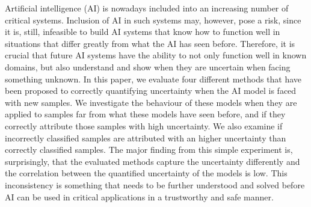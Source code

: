 
  Artificial intelligence (AI) is nowadays included into an increasing number of critical systems.
  Inclusion of AI in such systems may, however, pose a risk, since it is, still, infeasible to build AI systems that know how to function well in situations that differ greatly from what the AI has seen before.
  Therefore, it is crucial that future AI systems have the ability to not only function well in known domains, but also understand and show when they are uncertain when facing something unknown.
  In this paper, we evaluate four different methods that have been proposed to correctly quantifying uncertainty when the AI model is faced with new samples.
  We investigate the behaviour of these models when they are applied to samples far from what these models have seen before, and if they correctly attribute those samples with high uncertainty.
  We also examine if incorrectly classified samples are attributed with an higher uncertainty than correctly classified samples.
  The major finding from this simple experiment is, surprisingly, that the evaluated methods capture the uncertainty differently and the correlation between the quantified uncertainty of the models is low.
  This inconsistency is something that needs to be further understood and solved before AI can be used in critical applications in a trustworthy and safe manner.

